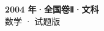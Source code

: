 \documentclass[zihao=-4, a4paper]{ctexart}
\begin{document}
\begin{center}
  {\Large\bfseries 2004 年·全国卷Ⅱ·文科}\\[4pt]
  {\large 数学 · 试题版}
\end{center}
\medskip
{}

\end{document}
